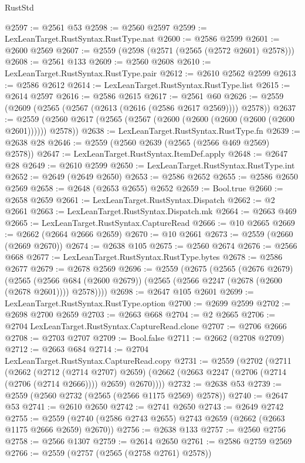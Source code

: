 \begin{lexlean}{RustStd}
\begin{coremodule}
@2597 := @2561 @53
@2598 := @2560 @2597
@2599 := LexLeanTarget.RustSyntax.RustType.nat
@2600 := @2586 @2599
@2601 := @2600 @2569
@2607 := @2559 (@2598 (@2571 (@2565 (@2572 @2601) @2578)))
@2608 := @2561 @133
@2609 := @2560 @2608
@2610 := LexLeanTarget.RustSyntax.RustType.pair
@2612 := @2610 @2562 @2599
@2613 := @2586 @2612
@2614 := LexLeanTarget.RustSyntax.RustType.list
@2615 := @2614 @2597
@2616 := @2586 @2615
@2617 := @2561 @60
@2626 := @2559 (@2609 (@2565 (@2567 (@2613 (@2616 (@2586 @2617 @2569)))) @2578))
@2637 := @2559 (@2560 @2617 (@2565 (@2567 (@2600 (@2600 (@2600 (@2600 (@2600 @2601)))))) @2578))
@2638 := LexLeanTarget.RustSyntax.RustType.fn
@2639 := @2638 @28
@2646 := @2559 (@2560 @2639 (@2565 (@2566 @469 @2569) @2578))
@2647 := LexLeanTarget.RustSyntax.ItemDef.apply
@2648 := @2647 @28
@2649 := @2610 @2599
@2650 := LexLeanTarget.RustSyntax.RustType.int
@2652 := @2649 (@2649 @2650)
@2653 := @2586 @2652
@2655 := @2586 @2650 @2569
@2658 := @2648 (@2653 @2655) @2652
@2659 := Bool.true
@2660 := @2658 @2659
@2661 := LexLeanTarget.RustSyntax.Dispatch
@2662 := @2 @2661
@2663 := LexLeanTarget.RustSyntax.Dispatch.mk
@2664 := @2663 @469
@2665 := LexLeanTarget.RustSyntax.CaptureRead
@2666 := @10 @2665
@2669 := @2662 (@2664 @2666 @2659)
@2670 := @10 @2661
@2673 := @2559 (@2660 (@2669 @2670))
@2674 := @2638 @105
@2675 := @2560 @2674
@2676 := @2566 @668
@2677 := LexLeanTarget.RustSyntax.RustType.bytes
@2678 := @2586 @2677
@2679 := @2678 @2569
@2696 := @2559
    (@2675
      (@2565
        (@2676 @2679)
        (@2565
          (@2566 @684 (@2600 @2679))
          (@2565 (@2566 @2247 (@2678 (@2600 (@2678 @2601)))) @2578))))
@2698 := @2647 @105 @2601
@2699 := LexLeanTarget.RustSyntax.RustType.option
@2700 := @2699 @2599
@2702 := @2698 @2700 @2659
@2703 := @2663 @668
@2704 := @2 @2665
@2706 := @2704 LexLeanTarget.RustSyntax.CaptureRead.clone
@2707 := @2706 @2666
@2708 := @2703 @2707
@2709 := Bool.false
@2711 := @2662 (@2708 @2709)
@2712 := @2663 @684
@2714 := @2704 LexLeanTarget.RustSyntax.CaptureRead.copy
@2731 := @2559
    (@2702
      (@2711
        (@2662
          (@2712 (@2714 @2707) @2659)
          (@2662 (@2663 @2247 (@2706 (@2714 (@2706 (@2714 @2666)))) @2659) @2670))))
@2732 := @2638 @53
@2739 := @2559 (@2560 @2732 (@2565 (@2566 @1175 @2569) @2578))
@2740 := @2647 @53
@2741 := @2610 @2650
@2742 := @2741 @2650
@2743 := @2649 @2742
@2755 := @2559 (@2740 (@2586 @2743 @2655) @2743 @2659 (@2662 (@2663 @1175 @2666 @2659) @2670))
@2756 := @2638 @133
@2757 := @2560 @2756
@2758 := @2566 @1307
@2759 := @2614 @2650
@2761 := @2586 @2759 @2569
@2766 := @2559 (@2757 (@2565 (@2758 @2761) @2578))

\end{coremodule}
\end{lexlean}
